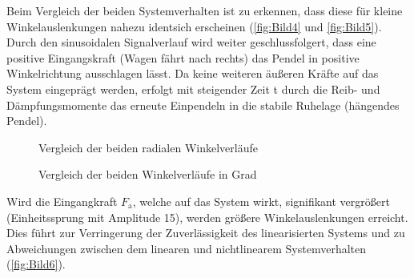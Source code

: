 \documentclass[
	pagesize,
	fontsize=12pt,
	paper=a4,
	oneside,
   reqno
]{scrartcl}
\begin{document}
Beim Vergleich der beiden Systemverhalten ist zu erkennen, dass diese für kleine Winkelauslenkungen nahezu identsich erscheinen (\autoref{fig:Bild4} und \autoref{fig:Bild5}). Durch den sinusoidalen Signalverlauf wird weiter geschlussfolgert, dass eine positive Eingangskraft (Wagen fährt nach rechts) das Pendel in positive Winkelrichtung ausschlagen lässt. Da keine weiteren äußeren Kräfte auf das System eingeprägt werden, erfolgt mit steigender Zeit t durch die Reib- und Dämpfungsmomente das erneute Einpendeln in die stabile Ruhelage (hängendes Pendel).
\begin{figure}[H]
   \centering
   \caption[Vergleich der beiden radialen Winkelverläufe]{Vergleich der beiden radialen Winkelverläufe}
   \label{fig:Bild4}
\end{figure}
\begin{figure}[H]
    \centering
    \caption[Vergleich der beiden Winkelverläufe in Grad]{Vergleich der beiden Winkelverläufe in Grad}
    \label{fig:Bild5}
\end{figure}
Wird die Eingangkraft $F_{\mathrm{a}}$, welche auf das System wirkt, signifikant vergrößert (Einheitssprung mit Amplitude 15), werden größere Winkelauslenkungen erreicht. Dies führt zur Verringerung der Zuverlässigkeit des linearisierten Systems und zu Abweichungen zwischen dem linearen und nichtlinearem Systemverhalten (\autoref{fig:Bild6}).
\end{document}
